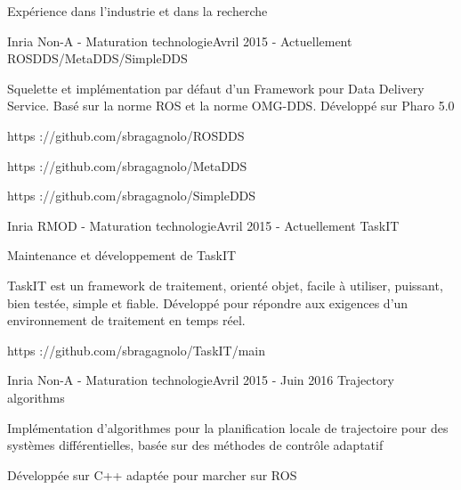 \documentclass{resume} %
\begin{document}
\begin{rSection}{Exp\'{e}rience dans l'industrie et dans la recherche}
	\begin{rSubsection}{Inria Non-A - Maturation technologie}{Avril 2015 - Actuellement }{ROSDDS/MetaDDS/SimpleDDS}
		\item 		
		\item Squelette et impl\'{e}mentation par d\'{e}faut d'un Framework pour Data Delivery Service.  Bas\'{e} sur la norme ROS et la norme OMG-DDS. D\'{e}velopp\'{e} sur Pharo 5.0 
		\item https ://github.com/sbragagnolo/ROSDDS		
		\item https ://github.com/sbragagnolo/MetaDDS
		\item https ://github.com/sbragagnolo/SimpleDDS
	\end{rSubsection}
	\begin{rSubsection}{Inria RMOD - Maturation technologie}{Avril 2015 - Actuellement }{TaskIT}
		\item 	
		\item Maintenance et d\'{e}veloppement de TaskIT
		\item TaskIT est un framework de traitement, orient\'{e} objet, facile \`{a} utiliser, puissant, bien test\'{e}e, simple et fiable. D\'{e}velopp\'{e} pour r\'{e}pondre aux exigences d'un environnement de traitement en temps r\'{e}el.
		\item  https ://github.com/sbragagnolo/TaskIT/main
	\end{rSubsection}
	\begin{rSubsection}{Inria Non-A - Maturation technologie}{Avril 2015 - Juin 2016 }{Trajectory algorithms}
		\item 
		\item Impl\'{e}mentation d'algorithmes pour la planification locale de trajectoire pour des syst\`emes diff\'{e}rentielles, bas\'{e}e sur des m\'ethodes de contr\^ole adaptatif 
		\item D\'{e}velopp\'{e}e sur C++ adapt\'{e}e pour marcher sur ROS
	\end{rSubsection}
	

\end{rSection}
\end{document}
